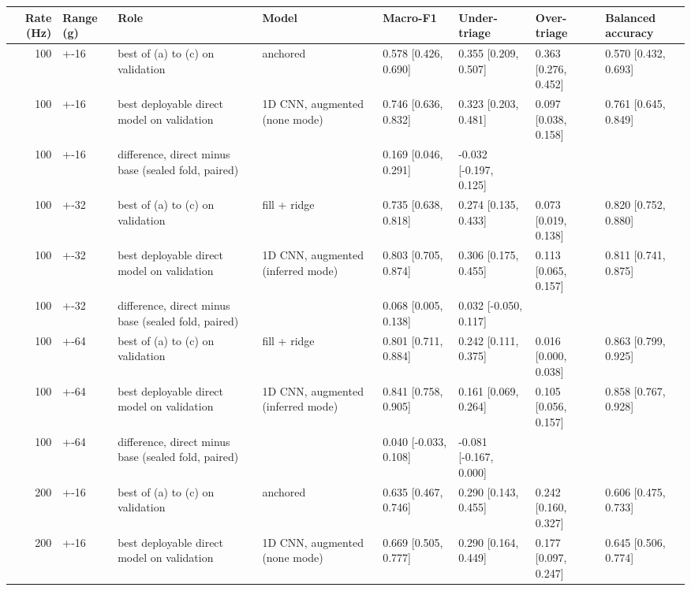 \begin{tabular}{rlllllll}
\toprule
Rate (Hz) & Range (g) & Role & Model & Macro-F1 & Under-triage & Over-triage & Balanced accuracy \\
\midrule
100 & +-16 & best of (a) to (c) on validation & anchored & 0.578 [0.426, 0.690] & 0.355 [0.209, 0.507] & 0.363 [0.276, 0.452] & 0.570 [0.432, 0.693] \\
100 & +-16 & best deployable direct model on validation & 1D CNN, augmented (none mode) & 0.746 [0.636, 0.832] & 0.323 [0.203, 0.481] & 0.097 [0.038, 0.158] & 0.761 [0.645, 0.849] \\
100 & +-16 & difference, direct minus base (sealed fold, paired) &  & 0.169 [0.046, 0.291] & -0.032 [-0.197, 0.125] &  &  \\
100 & +-32 & best of (a) to (c) on validation & fill + ridge & 0.735 [0.638, 0.818] & 0.274 [0.135, 0.433] & 0.073 [0.019, 0.138] & 0.820 [0.752, 0.880] \\
100 & +-32 & best deployable direct model on validation & 1D CNN, augmented (inferred mode) & 0.803 [0.705, 0.874] & 0.306 [0.175, 0.455] & 0.113 [0.065, 0.157] & 0.811 [0.741, 0.875] \\
100 & +-32 & difference, direct minus base (sealed fold, paired) &  & 0.068 [0.005, 0.138] & 0.032 [-0.050, 0.117] &  &  \\
100 & +-64 & best of (a) to (c) on validation & fill + ridge & 0.801 [0.711, 0.884] & 0.242 [0.111, 0.375] & 0.016 [0.000, 0.038] & 0.863 [0.799, 0.925] \\
100 & +-64 & best deployable direct model on validation & 1D CNN, augmented (inferred mode) & 0.841 [0.758, 0.905] & 0.161 [0.069, 0.264] & 0.105 [0.056, 0.157] & 0.858 [0.767, 0.928] \\
100 & +-64 & difference, direct minus base (sealed fold, paired) &  & 0.040 [-0.033, 0.108] & -0.081 [-0.167, 0.000] &  &  \\
200 & +-16 & best of (a) to (c) on validation & anchored & 0.635 [0.467, 0.746] & 0.290 [0.143, 0.455] & 0.242 [0.160, 0.327] & 0.606 [0.475, 0.733] \\
200 & +-16 & best deployable direct model on validation & 1D CNN, augmented (none mode) & 0.669 [0.505, 0.777] & 0.290 [0.164, 0.449] & 0.177 [0.097, 0.247] & 0.645 [0.506, 0.774] \\

\end{tabular}
